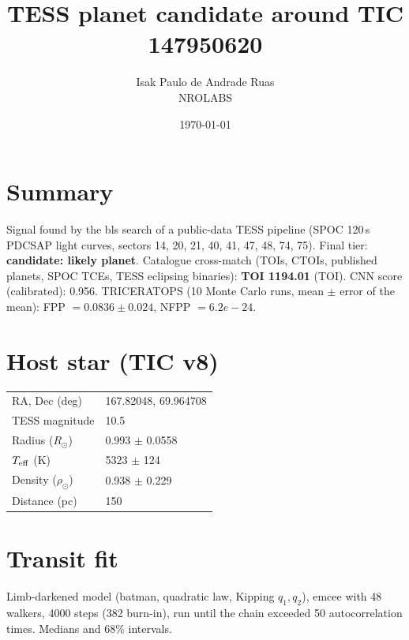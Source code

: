 \documentclass[11pt,a4paper]{article}
\title{TESS planet candidate around TIC 147950620}
\author{Isak Paulo de Andrade Ruas \\ NROLABS}
\date{\today}
\begin{document}
\maketitle

\section*{Summary}
Signal found by the bls search of a public-data TESS pipeline
(SPOC 120\,s PDCSAP light curves, sectors 14, 20, 21, 40, 41, 47, 48, 74, 75).
Final tier: \textbf{candidate: likely planet}.
Catalogue cross-match (TOIs, CTOIs, published planets, SPOC TCEs, TESS eclipsing binaries):
\textbf{TOI 1194.01} (TOI).
CNN score (calibrated): 0.956.
TRICERATOPS (10 Monte Carlo runs, mean $\pm$ error of the mean):
FPP $= 0.0836 \pm 0.024$,
NFPP $= 6.2e-24$.

\section*{Host star (TIC v8)}
\begin{tabular}{ll}\toprule
RA, Dec (deg) & 167.82048, 69.964708 \\
TESS magnitude & 10.5 \\
Radius ($R_\odot$) & 0.993 $\pm$ 0.0558 \\
$T_{\rm eff}$ (K) & 5323 $\pm$ 124 \\
Density ($\rho_\odot$) & 0.938 $\pm$ 0.229 \\
Distance (pc) & 150 \\\bottomrule
\end{tabular}

\section*{Transit fit}
Limb-darkened model (batman, quadratic law, Kipping $q_1,q_2$), emcee with 48 walkers,
4000 steps (382 burn-in), run until the chain exceeded 50 autocorrelation times.
Medians and 68\% intervals.
\end{document}
